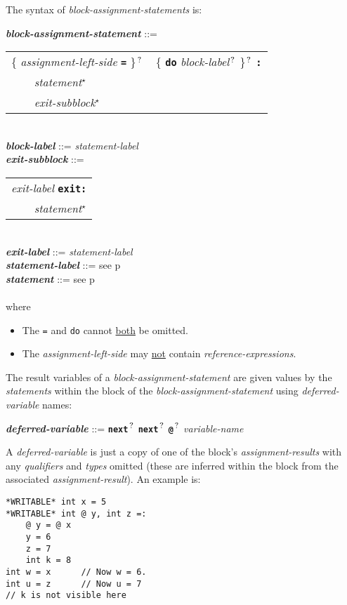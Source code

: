 \documentclass[12pt]{article}
\newcommand{\TT}[1]{{\tt \bfseries #1}}
\newcommand{\STAR}{{\Large $^\star$}}
\newcommand{\QMARK}{{$^{\,\mbox{\footnotesize ?}}$}}
\newcommand{\ttkey}[1]{{\tt \bfseries #1}}
\newcommand{\emkey}[1]{{\em \bfseries #1}}
\newcommand{\pagref}[1]{p\pageref{#1}}
\newenvironment{indpar}[1][0.3in]%
	{\begin{list}{}%
		     {\setlength{\itemsep}{0in}%
		      \setlength{\topsep}{0in}%
		      \setlength{\parsep}{1ex}%
		      \setlength{\labelwidth}{#1}%
		      \setlength{\leftmargin}{#1}%
		      \addtolength{\leftmargin}{\labelsep}}%
	 \item}%
	{\end{list}}
\begin{document}
The syntax of {\em block-assignment-statements} is:

\begin{indpar}
\emkey{block-assignment-statement} ::= \\
\hspace*{0.5in}\begin{tabular}[t]{l}
        \{ {\em assignment-left-side} \TT{=} \}\QMARK{}
	~ \{ \ttkey{do} {\em block-label}\QMARK{} \}\QMARK{}
	\TT{:} \\
	\TT{~~~~}{\em statement}\STAR{} \\
	\TT{~~~~}{\em exit-subblock}\STAR{}
	\end{tabular} \\
\emkey{block-label} ::= {\em statement-label}
\\[0.5ex]
\emkey{exit-subblock} ::=
    \begin{tabular}[t]{l}
    {\em exit-label} \ttkey{exit}\TT{:} \\
    \TT{~~~~}{\em statement}\STAR{} \\
    \end{tabular} \\
\emkey{exit-label} ::= {\em statement-label}
\\[0.5ex]
\emkey{statement-label} ::= see \pagref{STATEMENT-LABEL} \\
\emkey{statement} ::= see \pagref{STATEMENT} \\
\\[1ex]
where
\begin{itemize}
\item The {\tt =} and {\tt do} cannot \underline{both} be omitted.
\item The {\em assignment-left-side} may \underline{not} contain
{\em reference-expressions}.
\end{itemize}
\end{indpar}

The result variables of a {\em block-assignment-statement}
are given values by the {\em statements} within the block
of the {\em block-assignment-statement} using {\em deferred-variable}
names:
\begin{indpar}
\emkey{deferred-variable}\label{DEFERRED-VARIABLE} ::=
    \TT{next}\QMARK{} \TT{next}\QMARK{} \TT{@}\QMARK{} {\em variable-name}
\end{indpar}
A {\em deferred-variable} is just a copy of one of the
block's {\em assignment-results} with any {\em qualifiers}
and {\em types} omitted (these are inferred within the block
from the associated {\em assignment-result}).  An example is:
\begin{indpar}\begin{verbatim}
*WRITABLE* int x = 5
*WRITABLE* int @ y, int z =:
    @ y = @ x
    y = 6
    z = 7
    int k = 8
int w = x      // Now w = 6.
int u = z      // Now u = 7
// k is not visible here
\end{verbatim}\end{indpar}
\end{document}
